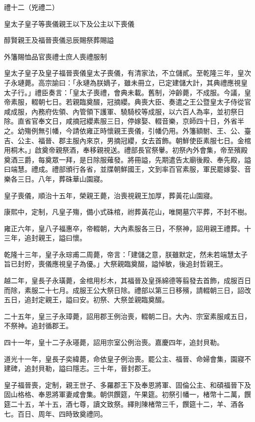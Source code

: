 
\begin{pinyinscope}
禮十二（兇禮二）

皇太子皇子等喪儀親王以下及公主以下喪儀

醇賢親王及福晉喪儀忌辰賜祭葬賜謚

外籓賜恤品官喪禮士庶人喪禮服制

皇太子皇子及皇子福晉喪儀皇太子喪儀，有清家法，不立儲貳。至乾隆三年，皇次子永璉薨。高宗諭曰：「永璉為朕嫡子，雖未冊立，已定建儲大計，其典禮應視皇太子行。」禮臣奏言：「皇太子喪禮，會典未載。舊制，沖齡薨，不成服。今議，皇帝素服，輟朝七日。若親臨奠醊，冠摘纓。典喪大臣、奏遣之王公暨皇太子侍從官咸成服，內務府佐領、內管領下護軍、驍騎校等成服，以六百人為率，並初祭日除。直省官奉文日，咸摘冠纓素服三日，停嫁娶、輟音樂，京師四十日，外省半之。幼殤例無引幡，今請依雍正時懷親王喪儀，引幡仍用。外籓額駙、王、公、臺吉、公主、福晉、郡主服內來京，男摘冠纓，女去首飾。朝鮮使臣素服七日。金棺用桐木。」啟奠帝親祭酒，奉移親視送。禮部長官祭轝。初祭內外會集，帝至殯殿奠酒三爵，每奠眾一拜，是日除服薙發。將冊謚，先期遣告太廟後殿、奉先殿，謚曰端慧。禮成。禮部頒行各省，並牒朝鮮國王，文到率百官素服，軍民罷嫁娶、音樂各三日。八年，葬硃華山園寢。

皇子喪儀，順治十五年，榮親王薨，治喪視親王加厚，葬黃花山園寢。

康熙中，定制，凡皇子殤，備小式硃棺，祔葬黃花山，唯開墓穴平葬，不封不樹。

雍正六年，皇八子福惠卒，帝輟朝，大內素服各三日，不祭神，詔用親王禮葬。十三年，追封親王，謚曰懷。

乾隆十三年，皇子永琮甫二周薨，帝言：「建儲之意，朕雖默定，然未若端慧太子旨已封貯，喪儀應視皇子為優。」大祭親臨奠醊，謚悼敏，後追封哲親王。

越二年，皇長子永璜薨，金棺用杉木，其福晉及皇孫綿德等翦發去首飾，成服百日而除，素服二十七月。成服王公大祭日除。禮部以第三日移殯，請輟朝三日，詔改五日，追封定親王，謚曰安。初祭、大祭並親臨奠醊。

二十五年，皇三子永璋薨，詔用郡王例治喪，輟朝二日。大內、宗室素服咸五日，不祭神。追封循郡王。

四十一年，皇十二子永璂薨，詔用宗室公例治喪。嘉慶四年，追封貝勒。

道光十一年，皇長子奕緯薨，命依皇子例治喪。罷公主、福晉、命婦會集，園寢不建碑，追封貝勒，謚曰隱志。三十年，晉封郡王。

皇子福晉喪，定制，親王世子、多羅郡王下及奉恩將軍、固倫公主、和碩福晉下及固山格格、奉恩將軍妻咸會集。朝供饌筵，午果筵。初祭引幡一，楮幣十二萬，饌筵二十五，羊十五，酒七尊，讀文致祭。繹則陳楮幣三千，饌筵十二，羊、酒各七。百日、周年、四時致奠禮同。


\end{pinyinscope}
